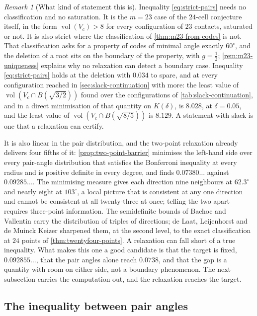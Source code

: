 \documentclass[11pt,reqno]{amsart}
\renewcommand{\_}{\origunderscore\allowbreak}
\numberwithin{equation}{section}
\theoremstyle{plain}
\theoremstyle{definition}
\theoremstyle{remark}
\newtheorem{remark}[thm]{Remark}
\DeclareMathOperator{\vol}{vol}
\begin{document}
\begin{remark}[What kind of statement this is]\label{rem:strict-kind}
Inequality \eqref{eq:strict-pairs} needs no classification and no
saturation. It is the $m=23$ case of the $24$-cell conjecture itself, in
the form $\vol(V_c)>8$ for every configuration of $23$ contacts,
saturated or not. It is also strict where the classification of
\cref{thm:m23-from-codes} is not. That classification asks for a
property of codes of minimal angle exactly $60^\circ$, and the deletion
of a root sits on the boundary of the property, with $g=\tfrac12$;
\cref{rem:m23-uniqueness} explains why no relaxation can detect a
boundary case. Inequality \eqref{eq:strict-pairs} holds at the deletion
with $0.034$ to spare, and at every configuration reached in
\cref{sec:slack-continuation} with more: the least value of
$\vol(V_c\cap B(\sqrt{3/2}))$ found over the configurations of
\cref{tab:slack-continuation}, and in a direct minimisation of that
quantity on $K(\delta)$, is $8.028$, at $\delta=0.05$, and the least value
of $\vol(V_c\cap B(\sqrt{8/5}))$ is $8.129$. A statement with slack is one
that a relaxation can certify.

It is also linear in the pair distribution, and the two-point
relaxation already delivers four fifths of it:
\cref{prop:two-point-barrier} minimises the left-hand side over every
pair-angle distribution that satisfies the Bonferroni inequality at
every radius and is positive definite in every degree, and finds
$0.07380\ldots$ against $0.09285\ldots$. The minimising measure gives
each direction nine neighbours at $62.3^\circ$ and nearly eight at
$103^\circ$, a local picture that is consistent at any one direction
and cannot be consistent at all twenty-three at once; telling the two
apart requires three-point information. The semidefinite bounds of
Bachoc and Vallentin \cite{BV08} carry the distribution of triples of
directions; de Laat, Leijenhorst and de Muinck Keizer \cite{LLM24}
sharpened them, at the second level, to the exact classification at $24$
points of \cref{thm:twentyfour-points}. A relaxation can fall short of a
true inequality. What makes this one a good candidate is that the target
is fixed, $0.092855\ldots$, that the pair angles alone reach $0.0738$, and
that the gap is a quantity with room on either side, not a boundary
phenomenon. The next subsection carries the computation out, and the
relaxation reaches the target.
\end{remark}

\subsection{The inequality between pair angles}\label{sec:certificate}
\end{document}
